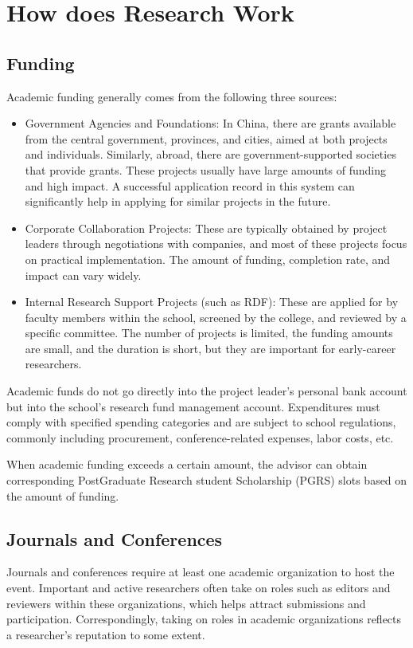 \section{How does Research Work}
\label{section.how-research-works}

\subsection{Funding}
Academic funding generally comes from the following three sources:
\begin{itemize}
    \item Government Agencies and Foundations: In China, there are grants available from the central government, provinces, and cities, aimed at both projects and individuals. Similarly, abroad, there are government-supported societies that provide grants. These projects usually have large amounts of funding and high impact. A successful application record in this system can significantly help in applying for similar projects in the future.
    \item Corporate Collaboration Projects: These are typically obtained by project leaders through negotiations with companies, and most of these projects focus on practical implementation. The amount of funding, completion rate, and impact can vary widely.
    \item Internal Research Support Projects (such as RDF): These are applied for by faculty members within the school, screened by the college, and reviewed by a specific committee. The number of projects is limited, the funding amounts are small, and the duration is short, but they are important for early-career researchers.
\end{itemize}

Academic funds do not go directly into the project leader’s personal bank account but into the school’s research fund management account. Expenditures must comply with specified spending categories and are subject to school regulations, commonly including procurement, conference-related expenses, labor costs, etc.

When academic funding exceeds a certain amount, the advisor can obtain corresponding PostGraduate Research student Scholarship (PGRS) slots based on the amount of funding.


\subsection{Journals and Conferences}
Journals and conferences require at least one academic organization to host the event. Important and active researchers often take on roles such as editors and reviewers within these organizations, which helps attract submissions and participation. Correspondingly, taking on roles in academic organizations reflects a researcher’s reputation to some extent.

